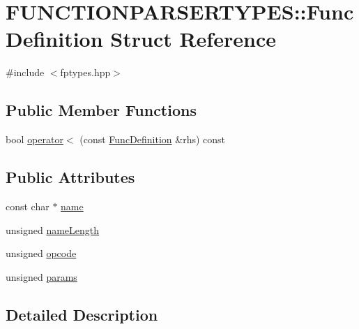\hypertarget{struct_f_u_n_c_t_i_o_n_p_a_r_s_e_r_t_y_p_e_s_1_1_func_definition}{}\section{F\+U\+N\+C\+T\+I\+O\+N\+P\+A\+R\+S\+E\+R\+T\+Y\+P\+ES\+:\+:Func\+Definition Struct Reference}
\label{struct_f_u_n_c_t_i_o_n_p_a_r_s_e_r_t_y_p_e_s_1_1_func_definition}


{\ttfamily \#include $<$fptypes.\+hpp$>$}

\subsection*{Public Member Functions}
\begin{DoxyCompactItemize}
\item 
bool \hyperlink{struct_f_u_n_c_t_i_o_n_p_a_r_s_e_r_t_y_p_e_s_1_1_func_definition_aa9bc160b5f3b43d1bbcbccd5d101e2c9}{operator$<$} (const \hyperlink{struct_f_u_n_c_t_i_o_n_p_a_r_s_e_r_t_y_p_e_s_1_1_func_definition}{Func\+Definition} \&rhs) const
\end{DoxyCompactItemize}
\subsection*{Public Attributes}
\begin{DoxyCompactItemize}
\item 
const char $\ast$ \hyperlink{struct_f_u_n_c_t_i_o_n_p_a_r_s_e_r_t_y_p_e_s_1_1_func_definition_a6871458a853f321b0f566775d5c5d79c}{name}
\item 
unsigned \hyperlink{struct_f_u_n_c_t_i_o_n_p_a_r_s_e_r_t_y_p_e_s_1_1_func_definition_a983fcca7d404cf18feeadf590ea2f01a}{name\+Length}
\item 
unsigned \hyperlink{struct_f_u_n_c_t_i_o_n_p_a_r_s_e_r_t_y_p_e_s_1_1_func_definition_a0195d4058feaa7faba3394c44d878503}{opcode}
\item 
unsigned \hyperlink{struct_f_u_n_c_t_i_o_n_p_a_r_s_e_r_t_y_p_e_s_1_1_func_definition_a023b73dfd337217c13d90f6498700094}{params}
\end{DoxyCompactItemize}


\subsection{Detailed Description}


